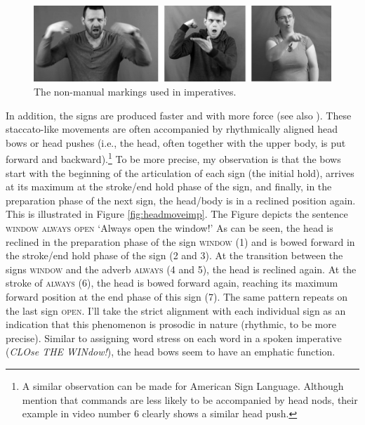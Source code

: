 \begin{figure}[bt]
\centering
	\includegraphics[width=1.0\textwidth]{imperativefacialexpressionsw.jpg}
	\caption{The non-manual markings used in imperatives.}
	\label{fig:imperativefacial}
\end{figure} 

In addition, the signs are produced faster and with more force (see also \citealt[341]{happ2014vork}). These staccato-like movements are often accompanied by rhythmically aligned head bows or head pushes (i.e., the head, often together with the upper body, is put forward and backward).\footnote{A similar observation can be made for American Sign Language. Although \citet{brentari2018production} mention that commands are less likely to be accompanied by head nods, their example in video number 6 clearly shows a similar head push.} To be more precise, my observation is that the bows start with the beginning of the articulation of each sign (the initial hold), arrives at its maximum at the stroke/end hold phase of the sign, and finally, in the preparation phase of the next sign, the head/body is in a reclined position again. This is illustrated in Figure \ref{fig:headmoveimp}. The Figure depicts the sentence \textsc{window always open} `Always open the window!' As can be seen, the head is reclined in the preparation phase of the sign \textsc{window} (1) and is bowed forward in the stroke/end hold phase of the sign (2 and 3). At the transition between the signs \textsc{window} and the adverb \textsc{always} (4 and 5), the head is reclined again.  At the stroke of \textsc{always} (6), the head is bowed forward again, reaching its maximum forward position at the end phase of this sign (7). The same pattern repeats on the last sign \textsc{open}. I'll take the strict alignment with each individual sign as an indication that this phenomenon is prosodic in nature (rhythmic, to be more precise). Similar to assigning word stress on each word in a spoken imperative (\textit{CLOse THE WINdow!}), the head bows seem to have an emphatic function.%

